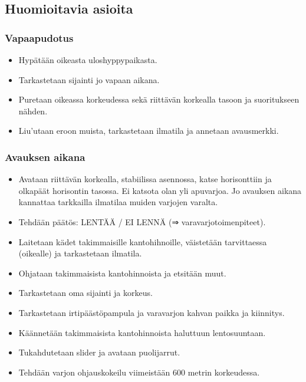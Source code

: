 \subsection{ Huomioitavia asioita }
\label{kuvunkasittely-oppilaana-huomioitavia-asioita}

\subsubsection{ Vapaapudotus }
\label{kuvunkasittely-oppilaana-vapaapudotus}

\begin{itemize}
\item  Hypätään oikeasta uloshyppypaikasta. 
\item  Tarkastetaan sijainti jo vapaan aikana. 
\item  Puretaan oikeassa korkeudessa sekä riittävän korkealla tasoon ja suoritukseen nähden. 
\item  Liu’utaan eroon muista, tarkastetaan ilmatila ja annetaan avausmerkki. 
\end{itemize}
\subsubsection{ Avauksen aikana }
\label{kuvunkasittely-oppilaana-avauksen-aikana}

\begin{itemize}
\item  Avataan riittävän korkealla, stabiilissa asennossa, katse horisonttiin ja olkapäät horisontin tasossa. Ei katsota olan yli apuvarjoa. Jo avauksen aikana kannattaa tarkkailla ilmatilaa muiden varjojen varalta. 
\item  Tehdään päätös: LENTÄÄ / EI LENNÄ (⇒ varavarjotoimenpiteet). 
\item  Laitetaan kädet takimmaisille kantohihnoille, väistetään tarvittaessa (oikealle) ja tarkastetaan ilmatila. 
\item  Ohjataan takimmaisista kantohinnoista ja etsitään muut. 
\item  Tarkastetaan oma sijainti ja korkeus. 
\item  Tarkastetaan irtipäästöpampula ja varavarjon kahvan paikka ja kiinnitys. 
\item  Käännetään takimmaisista kantohinnoista haluttuun lentosuuntaan. 
\item  Tukahdutetaan slider ja avataan puolijarrut. 
\item  Tehdään varjon ohjauskokeilu viimeistään 600 metrin korkeudessa. 
\end{itemize}
